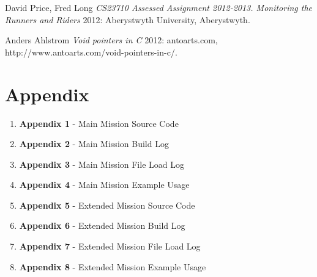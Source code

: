 \documentclass[12pt]{article}
\begin{document}
  \begin{thebibliography}{1}

   David Price, Fred Long {\em CS23710 Assessed Assignment 2012-2013. Monitoring the Runners and Riders}  2012: Aberystwyth University, Aberystwyth.

    Anders Ahlstrom {\em Void pointers in C}  2012: antoarts.com, http://www.antoarts.com/void-pointers-in-c/.

  \end{thebibliography}
  
\section*{Appendix}

\begin{enumerate}
  \item \textbf{Appendix 1} - Main Mission Source Code
  \item \textbf{Appendix 2} - Main Mission Build Log
  \item \textbf{Appendix 3} - Main Mission File Load Log
  \item \textbf{Appendix 4} - Main Mission Example Usage
  \item \textbf{Appendix 5} - Extended Mission Source Code
  \item \textbf{Appendix 6} - Extended Mission Build Log
  \item \textbf{Appendix 7} - Extended Mission File Load Log
  \item \textbf{Appendix 8} - Extended Mission Example Usage
\end{enumerate}
\end{document}
